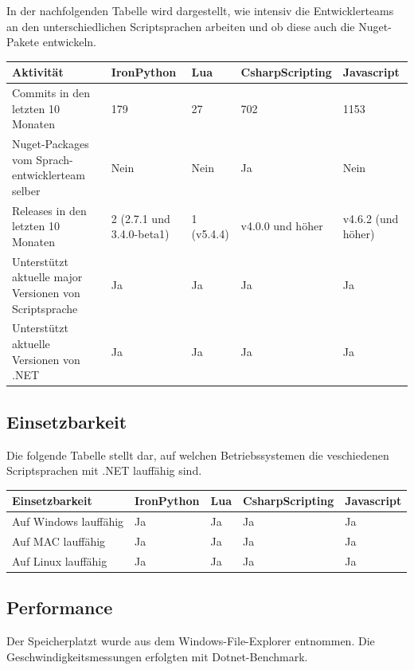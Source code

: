 In der nachfolgenden Tabelle wird dargestellt, wie intensiv die Entwicklerteams an den unterschiedlichen Scriptsprachen arbeiten und ob diese auch die Nuget-Pakete entwickeln.
\begin{table}[H]
    \begin{tabular}{|p{3cm}|p{3cm}|p{3cm}|p{3cm}|p{3cm}|}
        \hline
        Aktivität & IronPython & Lua & CsharpScripting & Javascript\\ \hline
        Commits in den letzten 10 Monaten & 179 & 27 & 702 & 1153 \\ \hline
        Nuget-Packages vom Sprach-entwicklerteam selber &Nein &Nein &Ja & Nein\\ \hline
        Releases in den letzten 10 Monaten & 2 (2.7.1 und 3.4.0-beta1) & 1 (v5.4.4) & v4.0.0 und höher & v4.6.2 (und höher)\\ \hline
        Unterstützt aktuelle major Versionen von Scriptsprache & Ja & Ja & Ja & Ja\\ \hline
        Unterstützt aktuelle Versionen von .NET & Ja & Ja & Ja & Ja \\ \hline
    \end{tabular}
\end{table}
\newpage
\subsection{Einsetzbarkeit}
Die folgende Tabelle stellt dar, auf welchen Betriebssystemen die veschiedenen Scriptsprachen mit .NET lauffähig sind.

\begin{table}[H]
    \center
    \begin{tabular}{|p{3cm}|p{3cm}|p{3cm}|p{3cm}|p{3cm}|}
        \hline
        Einsetzbarkeit & IronPython & Lua & CsharpScripting & Javascript\\ \hline
        Auf Windows lauffähig & Ja & Ja & Ja & Ja \\ \hline
        Auf MAC lauffähig & Ja & Ja & Ja & Ja \\ \hline
        Auf Linux lauffähig & Ja & Ja & Ja & Ja \\ \hline
 
    \end{tabular}
\end{table}
\newpage
\subsection{Performance}
Der Speicherplatzt wurde aus dem Windows-File-Explorer entnommen. 
Die Geschwindigkeitsmessungen erfolgten mit Dotnet-Benchmark.

